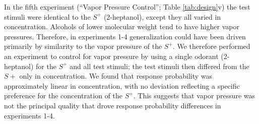 In the fifth experiment (``Vapor Pressure Control''; Table \ref{tab:design}v) the test stimuli were identical to the $S^+$ (2-heptanol), except they all varied in concentration.  
Alcohols of lower molecular weight tend to have higher vapor pressures.  
Therefore, in experiments 1-4 generalization could have been driven primarily by similarity to the vapor pressure of the $S^+$.  
We therefore performed an experiment to control for vapor pressure by using a single odorant (2-heptanol) for the $S^+$ and all test stimuli; the test stimuli then differed from the $S+$ only in concentration.  
We found that response probability was approximately linear in concentration, with no deviation reflecting a specific preference for the concentration of the $S^+$.  
This suggests that vapor pressure was not the principal quality that drove response probability differences in experiments 1-4.  